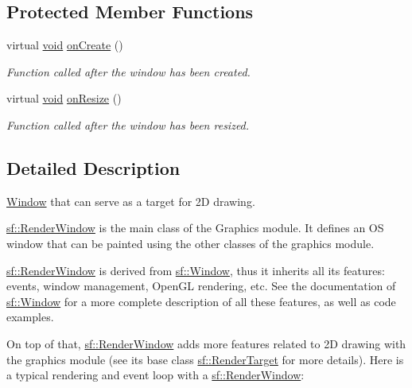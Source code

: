 \subsection*{Protected Member Functions}
\begin{DoxyCompactItemize}
\item 
virtual \hyperlink{glutf90_8h_ac778d6f63f1aaf8ebda0ce6ac821b56e}{void} \hyperlink{classsf_1_1_render_window_a5bef0040b0fa87bed9fbd459c980d53a}{on\-Create} ()
\begin{DoxyCompactList}\small\item\em Function called after the window has been created. \end{DoxyCompactList}\item 
virtual \hyperlink{glutf90_8h_ac778d6f63f1aaf8ebda0ce6ac821b56e}{void} \hyperlink{classsf_1_1_render_window_a5c85fe482313562d33ffd24a194b6fef}{on\-Resize} ()
\begin{DoxyCompactList}\small\item\em Function called after the window has been resized. \end{DoxyCompactList}\end{DoxyCompactItemize}


\subsection{Detailed Description}
\hyperlink{classsf_1_1_window}{Window} that can serve as a target for 2\-D drawing. 

\hyperlink{classsf_1_1_render_window}{sf\-::\-Render\-Window} is the main class of the Graphics module. It defines an O\-S window that can be painted using the other classes of the graphics module.

\hyperlink{classsf_1_1_render_window}{sf\-::\-Render\-Window} is derived from \hyperlink{classsf_1_1_window}{sf\-::\-Window}, thus it inherits all its features\-: events, window management, Open\-G\-L rendering, etc. See the documentation of \hyperlink{classsf_1_1_window}{sf\-::\-Window} for a more complete description of all these features, as well as code examples.

On top of that, \hyperlink{classsf_1_1_render_window}{sf\-::\-Render\-Window} adds more features related to 2\-D drawing with the graphics module (see its base class \hyperlink{classsf_1_1_render_target}{sf\-::\-Render\-Target} for more details). Here is a typical rendering and event loop with a \hyperlink{classsf_1_1_render_window}{sf\-::\-Render\-Window}\-:


